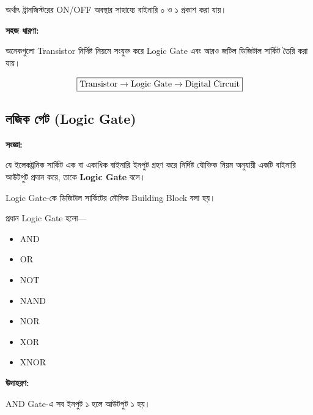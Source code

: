 অর্থাৎ ট্রানজিস্টরের \textenglish{ON/OFF} অবস্থার সাহায্যে
বাইনারি ০ ও ১ প্রকাশ করা যায়।

\par\begingroup

\textbf{সহজ ধারণা:}

অনেকগুলো \textenglish{Transistor} নির্দিষ্ট নিয়মে সংযুক্ত করে
\textenglish{Logic Gate} এবং আরও জটিল ডিজিটাল সার্কিট তৈরি করা যায়।
\par\endgroup


\[
\boxed{
\text{\textenglish{Transistor}}
\rightarrow
\text{\textenglish{Logic Gate}}
\rightarrow
\text{\textenglish{Digital Circuit}}
}
\]


\subsection{লজিক গেট
(\textenglish{Logic Gate})}

\par\begingroup

\textbf{সংজ্ঞা:}

যে ইলেকট্রনিক সার্কিট এক বা একাধিক বাইনারি ইনপুট গ্রহণ করে
নির্দিষ্ট যৌক্তিক নিয়ম অনুযায়ী একটি বাইনারি আউটপুট প্রদান করে,
তাকে \textbf{\textenglish{Logic Gate}} বলে।
\par\endgroup


\textenglish{Logic Gate}-কে ডিজিটাল সার্কিটের মৌলিক
\textenglish{Building Block} বলা হয়।

প্রধান \textenglish{Logic Gate} হলো—

\begin{itemize}[label={{\bulletfont\textbullet}}, leftmargin=*, nosep]
    \item \textenglish{AND}
    \item \textenglish{OR}
    \item \textenglish{NOT}
    \item \textenglish{NAND}
    \item \textenglish{NOR}
    \item \textenglish{XOR}
    \item \textenglish{XNOR}
\end{itemize}

\textbf{\textcolor{ICTOrange}{উদাহরণ:}}

\textenglish{AND Gate}-এ সব ইনপুট ১ হলে আউটপুট ১ হয়।


